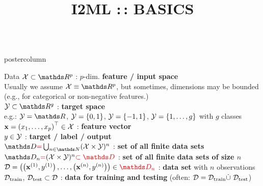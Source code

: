 \documentclass{beamer}
\title{I2ML :\,: BASICS} %
\newlength{\columnheight} %
\begin{document}
\begin{frame}[fragile]{}
\vspace{-8ex}
\begin{columns}
	\begin{column}{.31\textwidth}
		\begin{beamercolorbox}[center]{postercolumn}
			\begin{minipage}{.98\textwidth}
				\parbox[t][\columnheight]{\textwidth}{
					\begin{myblock}{Data}
					   $\Xspace \subset \R^p$ : $p$-dim. \textbf{feature / input space}\\ 
            \hspace*{1ex}Usually we assume $\Xspace \equiv \R^p$, but sometimes, dimensions may be bounded (e.g., for categorical or non-negative features.)    \\
            
            $\Yspace \subset \R^g$ : \textbf{target space} \\ 
            \hspace*{1ex}e.g.: $\Yspace = \R$, $\mathcal{Y} = \lbrace 0, 1 \rbrace$, $\mathcal{Y} = \lbrace -1, 1 \rbrace$, $\mathcal{Y} = \{1, \ldots, g\}$ with $g$ classes\\
            
            $\mathbf{x} = \left(x_1, \ldots, x_p\right)^\top \in \mathcal{X}$ : \textbf{feature vector} \\ 
             
            $y \in \mathcal{Y}$ : \textbf{target / label / output} \\
             
            $\allDatasets \textcolor{red}{=} \defAllDatasets$ : \textbf{set of all finite data sets} \\
             
            $\allDatasetsn \textcolor{red}{=} \defAllDatasetsn \textcolor{red}{\subset \allDatasets}$ : \textbf{set of all finite data sets of size $n$} \\
             
            $\D = \Dset \in \textcolor{red}{\allDatasetsn} $ : \textbf{data set} with $n$ observations \\
             
            $\mathcal{D}_{\text{train}}$, $\mathcal{D}_{\text{test}} \subset \mathcal{D}$ : \textbf{data for training and testing} (often: $\mathcal{D} = \mathcal{D}_{\text{train}} \dot{\cup} ~ \mathcal{D}_{\text{test}}$)\\
             

\end{myblock}}
\end{minipage}
\end{beamercolorbox}
\end{column}
\end{columns}
\end{frame}
\end{document}
